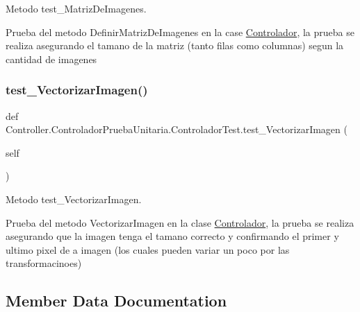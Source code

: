 Metodo test\+\_\+\+Matriz\+De\+Imagenes. 

Prueba del metodo Definir\+Matriz\+De\+Imagenes en la case \hyperlink{namespace_controller_1_1_controlador}{Controlador}, la prueba se realiza asegurando el tamano de la matriz (tanto filas como columnas) segun la cantidad de imagenes \mbox{\label{class_controller_1_1_controlador_prueba_unitaria_1_1_controlador_test_ab91d55bbbbfb2b11399063e00460fed6}} 
\subsubsection{\texorpdfstring{test\+\_\+\+Vectorizar\+Imagen()}{test\_VectorizarImagen()}}
{\footnotesize\ttfamily def Controller.\+Controlador\+Prueba\+Unitaria.\+Controlador\+Test.\+test\+\_\+\+Vectorizar\+Imagen (\begin{DoxyParamCaption}\item[{}]{self }\end{DoxyParamCaption})}



Metodo test\+\_\+\+Vectorizar\+Imagen. 

Prueba del metodo Vectorizar\+Imagen en la clase \hyperlink{namespace_controller_1_1_controlador}{Controlador}, la prueba se realiza asegurando que la imagen tenga el tamano correcto y confirmando el primer y ultimo pixel de a imagen (los cuales pueden variar un poco por las transformacinoes) 

\subsection{Member Data Documentation}
\mbox{\label{class_controller_1_1_controlador_prueba_unitaria_1_1_controlador_test_a2f176dc83cda878c82e90b5eed2c321a}} 
